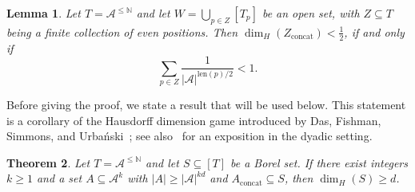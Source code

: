 \documentclass[a4,12pt]{article}%
\newtheorem{theorem}{Theorem}[section]
\newtheorem{lemma}[theorem]{Lemma}
\begin{document}
\begin{lemma} \label{lemma: Housdorf and sum 1/2}
Let $T=\mathcal A^{\leq \mathbb N}$ and let $W=\bigcup_{p\in Z}[T_p]$ be an open set, with $Z \subseteq T$ being a finite collection of even positions.  
Then $\dim_H(Z_{\mathrm{concat}})<\tfrac12$, if and only if
\[
\sum_{p\in Z} \frac{1}{|\mathcal A|^{ \mathrm{len}(p)/2 }} < 1.
\]
\end{lemma}
Before giving the proof, we state a result that will be used below. This statement is a corollary of the Hausdorff dimension game introduced by Das, Fishman, Simmons, and Urbański~\cite{DasFishmanHousdorfGame}; see also~\cite{DETwinnerHDIM} for an exposition in the dyadic setting.

\begin{theorem}\label{theorem Fishman game housdorf}
Let \(T=\mathcal{A}^{\le \mathbb{N}}\) and let \(S\subseteq [T]\) be a Borel set. 
If there exist integers \(k\ge 1\) and a set \(A\subseteq \mathcal{A}^k\) with \(|A|\ge |\mathcal{A}|^{k d}\) and \(A_{\mathrm{concat}} \subseteq S\),
then \(\dim_H(S)\ge d\).
\end{theorem}
\end{document}
